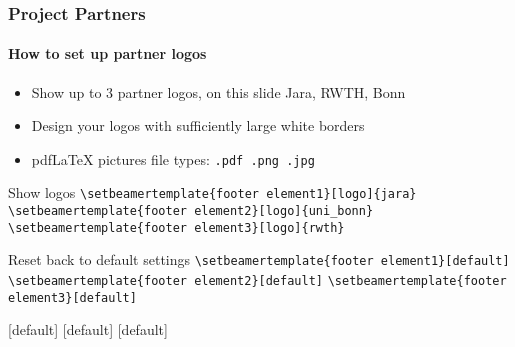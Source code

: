 \begin{frame}[fragile]
        \frametitle{Project Partners}
        \framesubtitle{How to set up partner logos}
        \begin{itemize}
      \item Show up to 3 partner logos, on this slide Jara, RWTH, Bonn
      \item Design your logos with sufficiently large white borders
      \item {pdf\LaTeX} pictures file types: \verb+.pdf .png .jpg+
    \end{itemize}
        \begin{block}{Show logos}
        \verb+\setbeamertemplate{footer element1}[logo]{jara}+
                \verb+\setbeamertemplate{footer element2}[logo]{uni_bonn}+
        \verb+\setbeamertemplate{footer element3}[logo]{rwth}+
    \end{block}
        \begin{block}{Reset back to default settings}
        \verb+\setbeamertemplate{footer element1}[default]+
        \verb+\setbeamertemplate{footer element2}[default]+
        \verb+\setbeamertemplate{footer element3}[default]+
    \end{block}
\end{frame}
[default]
[default]
[default]
